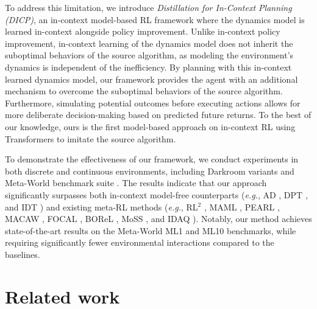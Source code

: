 \documentclass{article}
\begin{document}
To address this limitation, we introduce \emph{Distillation for In-Context Planning (DICP)}, an in-context model-based RL framework where the dynamics model is learned in-context alongside policy improvement.
Unlike in-context policy improvement, in-context learning of the dynamics model does not inherit the suboptimal behaviors of the source algorithm, as modeling the environment's dynamics is independent of the inefficiency.
By planning with this in-context learned dynamics model, our framework provides the agent with an additional mechanism to overcome the suboptimal behaviors of the source algorithm.
Furthermore, simulating potential outcomes before executing actions allows for more deliberate decision-making based on predicted future returns. 
To the best of our knowledge, ours is the first model-based approach on in-context RL using Transformers to imitate the source algorithm.

To demonstrate the effectiveness of our framework, we conduct experiments in both discrete and continuous environments, including Darkroom variants \citep{AD} and Meta-World benchmark suite \citep{MW}.
The results indicate that our approach significantly surpasses both in-context model-free counterparts (\textit{e.g.}, AD \citep{AD}, DPT \citep{DPT}, and IDT \citep{IDT}) and existing meta-RL methods (\textit{e.g.}, RL$^2$ \citep{RL2}, MAML \citep{MAML}, PEARL \citep{PEARL}, MACAW \citep{MACAW}, FOCAL \citep{FOCAL},  BOReL \citep{BOReL}, MoSS \citep{MoSS}, and IDAQ \citep{IDAQ}).
Notably, our method achieves state-of-the-art results on the Meta-World ML1 and ML10 benchmarks, while requiring significantly fewer environmental interactions compared to the baselines.


\section{Related work}
\label{sec:rel}
\end{document}
